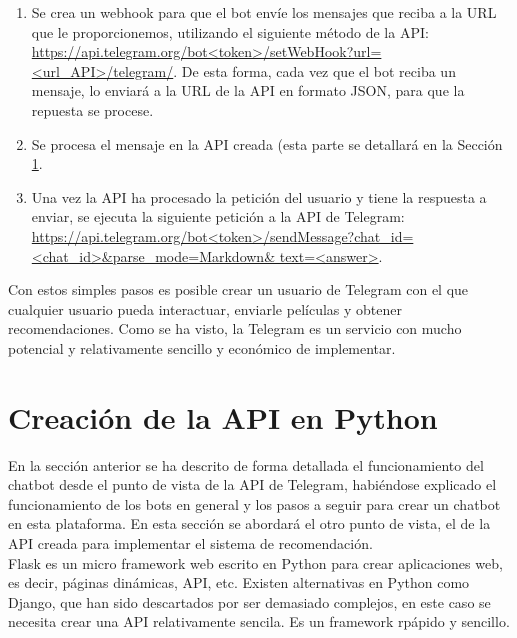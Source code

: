 \begin{enumerate}
    \item Se crea un webhook para que el bot envíe los mensajes que reciba a la URL que le proporcionemos, utilizando el siguiente método de la API: \url{https://api.telegram.org/bot<token>/setWebHook?url=<url_API>/telegram/}. De esta forma, cada vez que el bot reciba un mensaje, lo enviará a la URL de la API en formato JSON, para que la repuesta se procese.
    \item Se procesa el mensaje en la API creada (esta parte se detallará en la Sección \ref{sec:API}.
    \item Una vez la API ha procesado la petición del usuario y tiene la respuesta a enviar, se ejecuta la siguiente petición a la API de Telegram: \url{https://api.telegram.org/bot<token>/sendMessage?chat_id=<chat_id>&parse_mode=Markdown& text=<answer>}.
\end{enumerate}

Con estos simples pasos es posible crear un usuario de Telegram con el que cualquier usuario pueda interactuar, enviarle películas y obtener recomendaciones. Como se ha visto, la Telegram es un servicio con mucho potencial y relativamente sencillo y económico de implementar.

\section{Creación de la API en Python} \label{sec:API}

En la sección anterior se ha descrito de forma detallada el funcionamiento del chatbot desde el punto de vista de la API de Telegram, habiéndose explicado el funcionamiento de los bots en general y los pasos a seguir para crear un chatbot en esta plataforma. En esta sección se abordará el otro punto de vista, el de la API creada para implementar el sistema de recomendación.\\

Flask es un micro framework web escrito en Python para crear aplicaciones web, es decir, páginas dinámicas, API, etc. Existen alternativas en Python como Django, que han sido descartados por ser demasiado complejos, en este caso se necesita crear una API relativamente sencila. Es un framework rpápido y sencillo.

\begin{figure}[H]
    \centering
    \captionsetup{width=7cm}
    
\end{figure}

